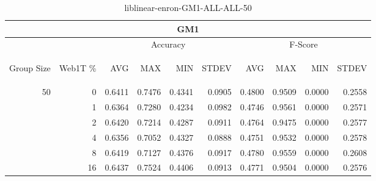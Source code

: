 \begin{center}
\begin{table}[htbp]
\begin{tabular}{ | r | r | r | r | r | r | r | r | r | r |}
\hline
\multicolumn{10}{|c|}{GM1}\\
\hline
 & & \multicolumn{4}{|c|}{Accuracy} & \multicolumn{4}{|c|}{F-Score}\\ \cline{3-10}
\begin{sideways}Group Size\end{sideways} & \begin{sideways}Web1T \%\end{sideways} & \begin{sideways}AVG\end{sideways} & \begin{sideways}MAX\end{sideways} & \begin{sideways}MIN\end{sideways} & \begin{sideways}STDEV\end{sideways} & \begin{sideways}AVG\end{sideways} & \begin{sideways}MAX\end{sideways} & \begin{sideways}MIN\end{sideways} & \begin{sideways}STDEV\end{sideways}\\
\hline
\multirow{5}{*}{50}
 & 0 & 0.6411 & 0.7476 & 0.4341 & 0.0905 & 0.4800 & 0.9509 & 0.0000 & 0.2558\\ \cline{2-10}
 & 1 & 0.6364 & 0.7280 & 0.4234 & 0.0982 & 0.4746 & 0.9561 & 0.0000 & 0.2571\\ \cline{2-10}
 & 2 & 0.6420 & 0.7214 & 0.4287 & 0.0911 & 0.4764 & 0.9475 & 0.0000 & 0.2577\\ \cline{2-10}
 & 4 & 0.6356 & 0.7052 & 0.4327 & 0.0888 & 0.4751 & 0.9532 & 0.0000 & 0.2578\\ \cline{2-10}
 & 8 & 0.6419 & 0.7127 & 0.4376 & 0.0917 & 0.4780 & 0.9559 & 0.0000 & 0.2608\\ \cline{2-10}
 & 16 & 0.6437 & 0.7524 & 0.4406 & 0.0913 & 0.4771 & 0.9504 & 0.0000 & 0.2576\\ \cline{2-10}
\hline
\end{tabular}
\caption{liblinear-enron-GM1-ALL-ALL-50}
\label{table:liblinear-enron-GM1-ALL-ALL-50}
\end{table}
\end{center}

